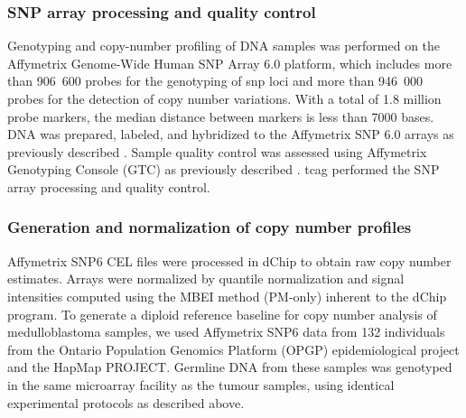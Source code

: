\subsubsection{SNP array processing and quality control}

Genotyping and copy-number profiling of DNA samples was performed on the Affymetrix Genome-Wide Human SNP Array 6.0 platform, which includes more than 906~600 probes for the genotyping of \gls{snp} loci and more than 946~000 probes for the detection of copy number variations. With a total of 1.8 million probe markers, the median distance between markers is less than 7000 bases. DNA was prepared, labeled, and hybridized to the Affymetrix SNP 6.0 arrays as previously described . Sample quality control was assessed using Affymetrix Genotyping Console (GTC) as previously described . \gls{tcag} performed the SNP array processing and quality control.

\subsubsection{Generation and normalization of copy number profiles}

Affymetrix SNP6 CEL files were processed in dChip  to obtain raw copy number estimates.  Arrays were normalized by quantile normalization and signal intensities computed using the MBEI method (PM-only) inherent to the dChip program.  To generate a diploid reference baseline for copy number analysis of medulloblastoma samples, we used Affymetrix SNP6 data from 132 individuals from the Ontario Population Genomics Platform (OPGP) epidemiological project and the HapMap PROJECT.  Germline DNA from these samples was genotyped in the same microarray facility as the tumour samples, using identical experimental protocols as described above.

